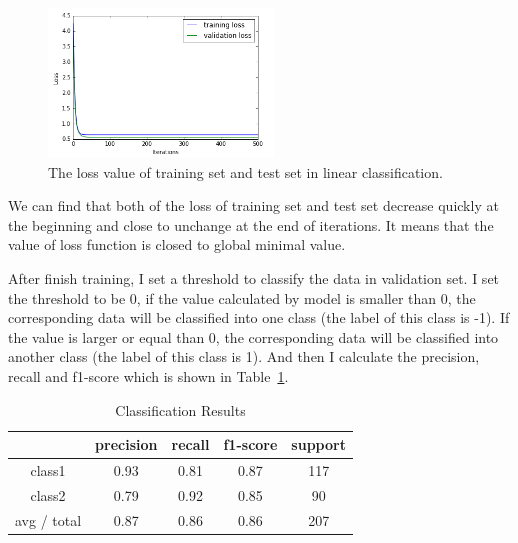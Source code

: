 \documentclass[journal, a4paper]{IEEEtran}
\begin{document}
\begin{figure}[htbp]
\centerline{\includegraphics[height=150px]{line_2.png}}
\caption{The loss value of training set and test set in linear classification.}
\label{fig_2}
\end{figure}

We can find that both of the loss of training set and test set decrease quickly at the beginning and close to unchange at the end of iterations. It means that the value of loss function is closed to global minimal value.

After finish training, I set a threshold to classify the data in validation set. I set the threshold to be 0, if the value calculated by model is smaller than 0, the corresponding data will be classified into one class (the label of this class is -1). If the value is larger or equal than 0, the corresponding data will be classified into another class (the label of this class is 1). And then I calculate the precision, recall and f1-score which is shown in Table~\ref{table_1}.

    \begin{table}[!hbt]
		\begin{center}
		\caption{Classification Results}
		\label{table_1}
		\begin{tabular}{|c|c|c|c|c|}
			\hline
			  & precision & recall & f1-score & support \\
			\hline
			class1 & 0.93 & 0.81 & 0.87  & 117 \\
			\hline
			class2 & 0.79 & 0.92 & 0.85  & 90 \\
			\hline
			avg / total & 0.87 & 0.86 & 0.86 & 207 \\
			\hline
		\end{tabular}
		\end{center}
	\end{table}
\end{document}
